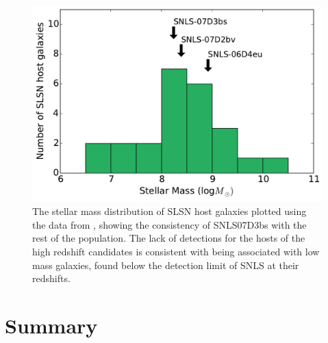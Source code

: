 \begin{figure}
\includegraphics[width=\textwidth]{Figures/Chapter4/Galaxy}
\caption{The stellar mass distribution of SLSN host galaxies plotted using the data from \citet{Lunnan2014}, showing the consistency of SNLS07D3bs with the rest of the population. The lack of detections for the hosts of the high redshift candidates is consistent with being associated with low mass galaxies, found below the detection limit of SNLS at their redshifts.}
\label{fig:hosts}
\end{figure}

\section{Summary}
